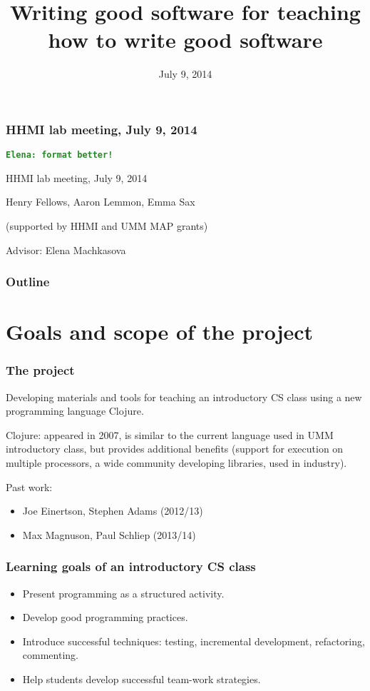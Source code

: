 \documentclass{beamer}
\newcommand{\comment}[1]{{\bf \tt  {#1}}}
\newcommand{\emcomment}[1]{\textcolor{ForestGreen}{\comment{Elena: {#1}}}}
\begin{document}
\title{Writing good software for teaching how to write good software}
\date{July 9, 2014}

\begin{frame}
\frametitle{HHMI lab meeting, July 9, 2014}
\emcomment{format better!}

{\centering
HHMI lab meeting, July 9, 2014 \par
}
Henry Fellows, Aaron Lemmon, Emma Sax\par
(supported by HHMI and UMM MAP grants)\par
Advisor: Elena Machkasova \par
\end{frame}

\begin{frame}[fragile]
\frametitle{Outline}
	\tableofcontents
\end{frame}


\section{Goals and scope of the project}

\begin{frame}[fragile]
\frametitle{The project}
Developing materials and tools for teaching an introductory CS class using a new programming language Clojure.

Clojure: appeared in 2007, is similar to the current language used in UMM introductory class, but provides additional benefits 
(support for execution on multiple processors, a wide community developing libraries, used in industry). 

Past work: 
\begin{itemize}
\item Joe Einertson, Stephen Adams (2012/13)
\item  Max Magnuson, Paul Schliep (2013/14)
\end{itemize}  
\end{frame}

\begin{frame}[fragile]
\frametitle{Learning goals of an introductory CS class}
\begin{itemize}
\item Present programming as a structured activity.
\item Develop good programming practices.
\item Introduce successful techniques: testing, incremental development, refactoring, commenting. 
\item Help students develop successful team-work strategies. 
\end{itemize}
\end{frame}
\end{document}
